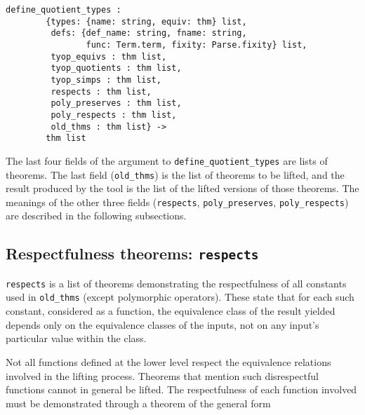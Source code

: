 \documentclass[envcountsame,runningheads]{llncs}
\begin{document}
\begin{verbatim}
define_quotient_types :
        {types: {name: string, equiv: thm} list,
         defs: {def_name: string, fname: string,
                func: Term.term, fixity: Parse.fixity} list,
         tyop_equivs : thm list,
         tyop_quotients : thm list,
         tyop_simps : thm list,
         respects : thm list,
         poly_preserves : thm list,
         poly_respects : thm list,
         old_thms : thm list} ->
        thm list
\end{verbatim}

\noindent
The last four fields of the argument to {\tt define\_quotient\_types}
are lists of theorems.  The last field ({\tt old\_thms})
is the list of theorems to be lifted, and the
result produced by the tool is
the list of the lifted versions of those theorems.
The meanings of the other three fields
({\tt respects}, {\tt poly\_preserves}, {\tt poly\_respects})
are described in the following subsections.




%
\subsection{Respectfulness theorems: {\tt respects}}
%
\label{respectfulness}

{\tt respects} is a list of theorems demonstrating the
respectfulness of all constants used in {\tt old\_thms}
(except polymorphic operators).
These state that for each such constant,
considered as a function,
the equivalence class of the result yielded
depends only on the equivalence classes of the inputs,
not on any input's particular
value
within the class.

Not all functions defined at the lower level
respect the equivalence relations involved in the
lifting process.  Theorems that mention such disrespectful functions
cannot in general be lifted.
The respectfulness of each function involved must be
demonstrated through a theorem of the general form
\end{document}
